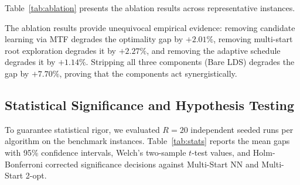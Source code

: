 \documentclass[11pt,a4paper]{article}
\begin{document}
Table~\ref{tab:ablation} presents the ablation results across representative instances.

\begin{table}[htbp]
\centering
\small
\caption{\textbf{Systematic Component Ablation Study ($k=3$, Seed 42).}}
\label{tab:ablation}
\end{table}

The ablation results provide unequivocal empirical evidence: removing candidate learning via MTF degrades the optimality gap by $+2.01\%$, removing multi-start root exploration degrades it by $+2.27\%$, and removing the adaptive schedule degrades it by $+1.14\%$. Stripping all three components (Bare LDS) degrades the gap by $+7.70\%$, proving that the components act synergistically.

\subsection{Statistical Significance and Hypothesis Testing}
To guarantee statistical rigor, we evaluated $R=20$ independent seeded runs per algorithm on the benchmark instances. Table~\ref{tab:stats} reports the mean gaps with 95\% confidence intervals, Welch's two-sample $t$-test values, and Holm-Bonferroni corrected significance decisions against Multi-Start NN and Multi-Start 2-opt.
\end{document}
